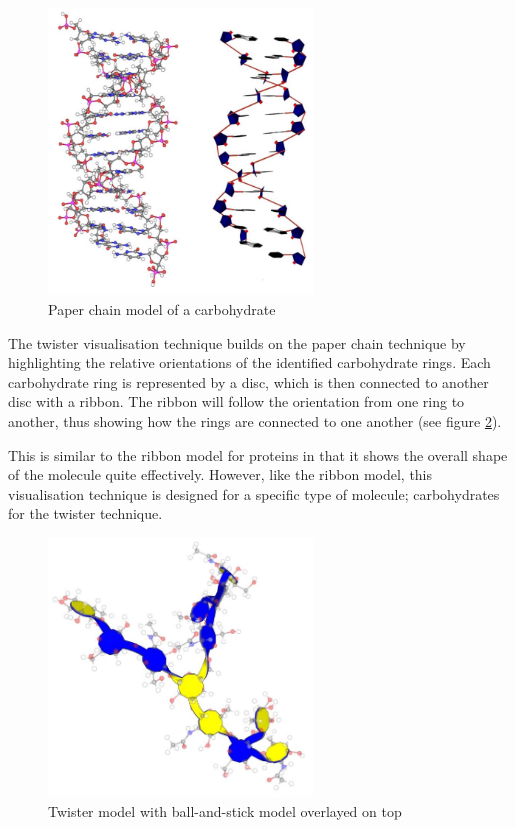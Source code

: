 \begin{figure}[h!]
  \begin{center}
    \includegraphics[width=70mm]{paper_chain}
  \end{center}
  \caption{Paper chain model of a carbohydrate}
  \label{fig:paperchain}
\end{figure}

The twister visualisation technique \citep{kuttel06} builds on the paper
chain technique by highlighting the relative orientations of the identified
carbohydrate rings. Each carbohydrate ring is represented by a disc, which is
then connected to another disc with a ribbon. The ribbon will follow the
orientation from one ring to another, thus showing how the rings are connected
to one another (see figure \ref{fig:twister}).

This is similar to the ribbon model for proteins in that it shows the overall
shape of the molecule quite effectively. However, like the ribbon model, this
visualisation technique is designed for a specific type of molecule;
carbohydrates for the twister technique.

\begin{figure}[h!]
  \begin{center}
    \includegraphics[width=70mm]{twister}
  \end{center}
  \caption{Twister model with ball-and-stick model overlayed on top}
  \label{fig:twister}
\end{figure}


